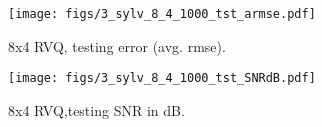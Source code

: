 								\begin{figure}[h!]
								\centering
								\texttt{[image: figs/3\_sylv\_8\_4\_1000\_tst\_armse.pdf]}
								\caption{8x4 RVQ, testing error (avg. rmse).}
								\label{fig:3_sylv_8_4_1000_tst_armse}
								\end{figure}

								\begin{figure}[h!]
								\centering
								\texttt{[image: figs/3\_sylv\_8\_4\_1000\_tst\_SNRdB.pdf]}
								\caption{8x4 RVQ,testing SNR in dB.}
								\label{fig:3_sylv_8_4_1000_tst_SNRdB}
								\end{figure}
